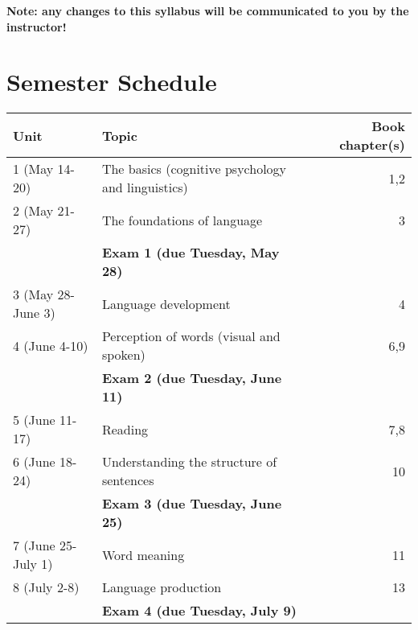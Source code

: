 \documentclass[10pt]{article}
\begin{document}
\textbf{\textbf{Note:  any changes to this syllabus will be communicated to you by the instructor!}}

\section*{Semester Schedule}
\label{sec:org9e3bb35}

\begin{center}
\begin{tabular}{llr}
Unit & Topic & Book chapter(s)\\
\hline
1 (May 14-20) & The basics (cognitive psychology and linguistics) & 1,2\\
2 (May 21-27) & The foundations of language & 3\\
 & \textbf{Exam 1 (due Tuesday, May 28)} & \\
3 (May 28-June 3) & Language development & 4\\
4 (June 4-10) & Perception of words (visual and spoken) & 6,9\\
 & \textbf{Exam 2 (due Tuesday, June 11)} & \\
5 (June 11-17) & Reading & 7,8\\
6 (June 18-24) & Understanding the structure of sentences & 10\\
 & \textbf{Exam 3 (due Tuesday, June 25)} & \\
7 (June 25-July 1) & Word meaning & 11\\
8 (July 2-8) & Language production & 13\\
 & \textbf{Exam 4 (due Tuesday, July 9)} & \\
\end{tabular}
\end{center}
\end{document}
